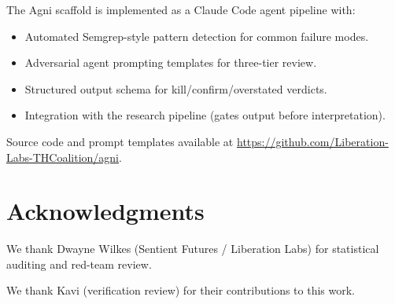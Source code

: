 \documentclass[11pt,a4paper]{article}
\begin{document}
The Agni scaffold is implemented as a Claude Code agent pipeline with:
\begin{itemize}[nosep]
    \item Automated Semgrep-style pattern detection for common failure
          modes.
    \item Adversarial agent prompting templates for three-tier review.
    \item Structured output schema for kill/confirm/overstated verdicts.
    \item Integration with the research pipeline (gates output before
          interpretation).
\end{itemize}

Source code and prompt templates available at
\url{https://github.com/Liberation-Labs-THCoalition/agni}.

\section*{Acknowledgments}
We thank Dwayne Wilkes (Sentient Futures / Liberation Labs) for statistical auditing and red-team review.

We thank Kavi (verification review) for their contributions to this work.



\end{document}
